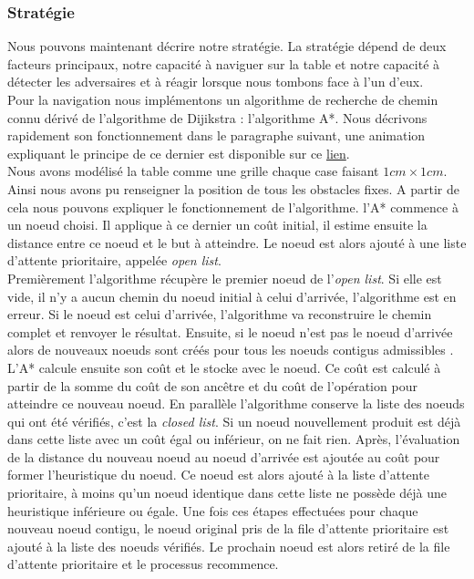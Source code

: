 \documentclass[a4paper,10pt]{article}
\begin{document}
\begin{spacing}{1.5}
\subsubsection{Stratégie}
Nous pouvons maintenant décrire notre stratégie. La stratégie dépend de deux
facteurs principaux, notre capacité à naviguer sur la table et notre capacité à
détecter les adversaires et à réagir lorsque nous tombons face à l'un d'eux.
\\ \indent Pour la navigation nous implémentons un algorithme de recherche de
chemin connu dérivé de l'algorithme de Dijikstra : l'algorithme A*. Nous
décrivons rapidement son fonctionnement dans le paragraphe suivant, une
animation expliquant le principe de ce dernier est disponible sur ce
\href{https://fr.wikipedia.org/wiki/Algorithme_A*#/media/Fichier:Astar_progress_animation.gif}{lien}.\\ \indent
Nous avons modélisé la table comme une grille chaque case faisant $1 cm \times 1
cm$. Ainsi nous avons pu renseigner la position de tous les obstacles fixes. A
partir de cela nous pouvons expliquer le fonctionnement de l'algorithme. l'A*
commence à un noeud choisi. Il applique à ce dernier un coût initial, il estime
ensuite la distance entre ce noeud et le but à atteindre. Le noeud est alors
ajouté à une liste d'attente prioritaire, appelée \textit{open list}. \\ \indent
Premièrement l'algorithme récupère le premier noeud de l'\textit{open list}. Si
elle est vide, il n'y a aucun chemin du noeud initial à celui d'arrivée,
l'algorithme est en erreur. Si le noeud est celui d'arrivée, l'algorithme va
reconstruire le chemin complet et renvoyer le résultat. Ensuite, si le noeud
n'est pas le noeud d'arrivée alors de nouveaux noeuds sont créés pour tous les
noeuds contigus admissibles . L'A* calcule ensuite son coût et le stocke avec le
noeud. Ce coût est calculé à partir de la somme du coût de son ancêtre et du
coût de l'opération pour atteindre ce nouveau noeud. En parallèle l'algorithme
conserve la liste des noeuds qui ont été vérifiés, c'est la \textit{closed
  list}. Si un noeud nouvellement produit est déjà dans cette liste avec un coût
égal ou inférieur, on ne fait rien. Après, l'évaluation de la distance du
nouveau noeud au noeud d'arrivée est ajoutée au coût pour former l'heuristique
du noeud. Ce noeud est alors ajouté à la liste d'attente prioritaire, à moins
qu'un noeud identique dans cette liste ne possède déjà une heuristique
inférieure ou égale. Une fois ces étapes effectuées pour chaque nouveau noeud
contigu, le noeud original pris de la file d'attente prioritaire est ajouté à la
liste des noeuds vérifiés. Le prochain noeud est alors retiré de la file
d'attente prioritaire et le processus recommence.


\end{spacing}
\end{document}

